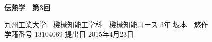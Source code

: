 \documentclass[a4j,twoside,openright,11pt]{jsarticle}
\begin{document}
\begin{screen}
\huge
\begin{center}
{\bf 伝熱学　第3回}\\
\end{center}

\normalsize
\begin{flushright}
九州工業大学　機械知能工学科　機械知能コース 3年 坂本　悠作\\学籍番号 13104069 \hspace{0.2in}提出日 2015年4月23日
\end{flushright}
\end{screen}
\end{document}

